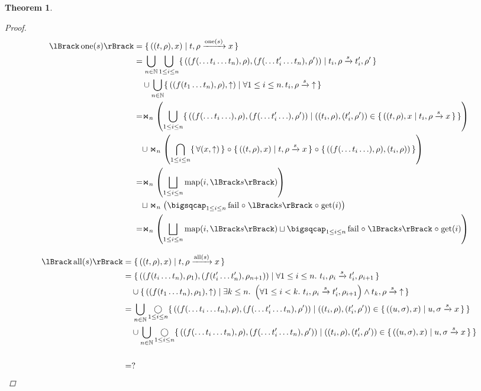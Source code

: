 \documentclass{article}
\newtheorem{theorem}{Theorem}
\newcommand{\fail}{\ensuremath \text{$\uparrow$}}
\newcommand{\one}[1]{\ensuremath \operatorname{one}(#1)}
\newcommand{\all}[1]{\ensuremath \operatorname{all}(#1)}
\newcommand{\transform}[5]{#1, #2 \xrightarrow{#3} #4, #5}
\newcommand{\transformx}[4]{#1, #2 \xrightarrow{#3} #4}
\newcommand{\transformfail}[3]{#1, #2 \xrightarrow{#3} \fail}
\newcommand{\sem}[1]{\ensuremath \lBrack #1 \rBrack}
\newcommand{\Nat}{\ensuremath \mathbb{N}}
\newcommand{\setbuild}[2]{\ensuremath \{\, #1 \mid #2 \,\}}
\newcommand{\setbuildc}[1]{\ensuremath \{\, #1 \,\}}
\newcommand{\lfail}{\ensuremath \operatorname{fail}}
\newcommand{\get}{\ensuremath \operatorname{get}}
\newcommand{\map}{\ensuremath \operatorname{map}}
\newcommand{\comp}{\ensuremath \mathrel{\circ}}
\newcommand{\witharity}{\ensuremath \Join}
\begin{document}
\begin{theorem}
\begin{proof}
\begin{align*}
  \sem{\one{s}}
    &= \setbuild{((t,\rho),x)}{\transformx{t}{\rho}{\one{s}}{x}} \\
    &= \bigcup_{n \in \Nat} \bigcup_{1 \leq i \leq n} \setbuild{((f(\ldots t_i \ldots t_n),\rho),(f(\ldots t_i' \ldots t_n),\rho'))}{\transform{t_i}{\rho}{s}{t_i'}{\rho'}} \\
    &\quad \cup \bigcup_{n \in \Nat} \setbuild{((f(t_1 \ldots t_n),\rho),\fail)}{\forall 1 \leq i \leq n.\, \transformfail{t_i}{\rho}{s}} \\
    &= \witharity_{n} \left( \bigcup_{1 \leq i \leq n} \setbuild{ ((f(\ldots t_i \ldots),\rho),(f(\ldots t_i' \ldots),\rho')) }{ ((t_i,\rho),(t_i',\rho')) \in \setbuild{ ((t,\rho),x }{ \transformx{t_i}{\rho}{s}{x} } } \right) \\
    &\quad \cup \witharity_{n} \left( \bigcap_{1 \leq i \leq n}  \setbuildc{ \forall (x,\fail) } \comp \setbuild{ ((t,\rho),x)}{ \transformx{t}{\rho}{s}{x} } \comp \setbuildc{ ((f(\ldots t_i \ldots),\rho),(t_i,\rho)) } \right) \\
    &= \witharity_{n} \left( \bigsqcup_{1 \leq i \leq n} \map(i,\sem{s}) \right) \\
    &\quad \sqcup \witharity_{n} \left( \bigsqcap_{1 \leq i \leq n}  \lfail \comp \sem{s} \comp \get(i) \right) \\
    &= \witharity_{n} \left( \bigsqcup_{1 \leq i \leq n} \map(i, \sem{s}) \sqcup \bigsqcap_{1 \leq i \leq n} \lfail \comp \sem{s} \comp \get(i) \right)
\end{align*}

\begin{align*}
  \sem{\all{s}}
    &= {\setbuild{((t,\rho),x)}{\transformx{t}{\rho}{\all{s}}{x}}} \\
    &= {\setbuild{((f(t_i\ldots t_n),\rho_1),(f(t_i'\ldots t_n'),\rho_{n+1}))}{ \forall 1 \leq i \leq n.\ \transform{t_i}{\rho_i}{s}{t_i'}{\rho_{i+1}}}} \\
    &\quad \cup \setbuild { ((f(t_1 \ldots t_n),\rho_1),\fail) }{ \exists k \leq n.\ \left(\forall 1 \leq i < k.\ \transform{t_i}{\rho_i}{s}{t_i'}{\rho_{i+1}}\right) \land \transformfail{t_k}{\rho}{s} } \\
    &= \bigcup_{n \in \mathbb{N}} \mathop{\bigcirc}_{1\leq i \leq n} \setbuild{((f(\ldots t_i \ldots t_n),\rho),(f(\ldots t_i' \ldots t_n),\rho'))}{ ((t_i,\rho),(t_i',\rho')) \in \setbuild{ ((u,\sigma),x) }{ \transformx{u}{\sigma}{s}{x} } } \\
    &\quad \cup \bigcup_{n \in \mathbb{N}} \mathop{\bigcirc}_{1 \leq i \leq n} \setbuild{((f(\ldots t_i \ldots t_n),\rho),(f(\ldots t_i' \ldots t_n),\rho'))}{ ((t_i,\rho),(t_i',\rho')) \in \setbuild{ ((u,\sigma),x) }{ \transformx{u}{\sigma}{s}{x} } } \\
    &\qquad\qquad\qquad  \\
    &= ?
\end{align*}
  
\end{proof}
\end{theorem}
\end{document}
